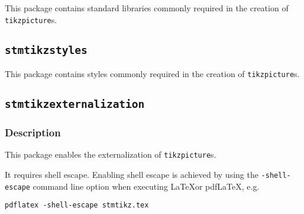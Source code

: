 \documentclass[%
  type=article,%
  layout=koma,%
  date=true,%
  hyperref=true,%
  listings=true,%
  tikz=false,%
]{stmtext}
\begin{document}

This package contains standard libraries commonly required in the creation of \texttt{tikzpicture}s.


\subsection{\protect\texttt{stmtikzstyles}}
\label{sec:usage:preamble:styles}


This package contains styles commonly required in the creation of \texttt{tikzpicture}s.


\subsection{\protect\texttt{stmtikzexternalization}}
\label{sec:usage:preamble:externalization}

\subsubsection{Description}
\label{sec:usage:preamble:externalization:description}

This package enables the externalization of \texttt{tikzpicture}s.

It requires shell escape. Enabling shell escape is achieved by using the \verb+-shell-escape+ command line option when executing \LaTeX or pdf\LaTeX, e.g.

\begin{verbatim}
pdflatex -shell-escape stmtikz.tex
\end{verbatim}
\end{document}
